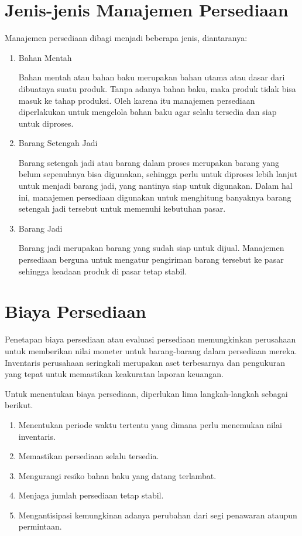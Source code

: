 \section{Jenis-jenis Manajemen Persediaan}

Manajemen persediaan dibagi menjadi beberapa jenis, diantaranya:

\begin{enumerate}
	\item Bahan Mentah
	
	Bahan mentah atau bahan baku merupakan bahan utama atau dasar dari dibuatnya suatu produk. Tanpa adanya bahan baku, maka produk tidak bisa masuk ke tahap produksi. Oleh karena itu manajemen persediaan diperlakukan untuk mengelola bahan baku agar selalu tersedia dan siap untuk diproses.
	
	\item Barang Setengah Jadi
	
	Barang setengah jadi atau barang dalam proses merupakan barang yang belum sepenuhnya bisa digunakan, sehingga perlu untuk diproses lebih lanjut untuk menjadi barang jadi, yang nantinya siap untuk digunakan. Dalam hal ini, manajemen persediaan digunakan untuk menghitung banyaknya barang setengah jadi tersebut untuk memenuhi kebutuhan pasar.

	\item Barang Jadi
	
	Barang jadi merupakan barang yang sudah siap untuk dijual. Manajemen persediaan berguna untuk mengatur pengiriman barang tersebut ke pasar sehingga keadaan produk di pasar tetap stabil.
\end{enumerate}

\section{Biaya Persediaan}

Penetapan biaya persediaan atau evaluasi persediaan memungkinkan perusahaan untuk memberikan nilai moneter untuk barang-barang dalam persediaan mereka. Inventaris perusahaan seringkali merupakan aset terbesarnya dan pengukuran yang tepat untuk memastikan keakuratan laporan keuangan.

Untuk menentukan biaya persediaan, diperlukan lima langkah-langkah sebagai berikut.

\begin{enumerate}
	\item Menentukan periode waktu tertentu yang dimana perlu menemukan nilai inventaris.
	\item Memastikan persediaan selalu tersedia.
	\item Mengurangi resiko bahan baku yang datang terlambat.
	\item Menjaga jumlah persediaan tetap stabil.
	\item Mengantisipasi kemungkinan adanya perubahan dari segi penawaran ataupun permintaan.
\end{enumerate}

